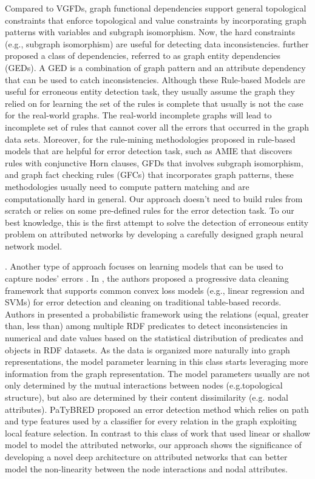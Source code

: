 Compared to VGFDs, graph functional dependencies support general topological constraints
that enforce topological and value constraints by incorporating graph patterns with variables and subgraph isomorphism. Now, the hard constraints (e.g., subgraph isomorphism) are useful for detecting data inconsistencies.  \cite{fan2017dependencies} further proposed a class of dependencies, referred to as graph entity dependencies (GEDs). A GED is a combination of graph pattern and an attribute dependency that can be used to catch inconsistencies.   
Although these Rule-based Models are useful for erroneous entity detection task, they usually assume the graph they relied on for learning the set of the rules is complete that usually is not the case for the real-world graphs. The real-world incomplete graphs will lead to incomplete set of rules that cannot cover all the errors that occurred in the graph data sets. Moreover, for the rule-mining methodologies proposed in rule-based models that are helpful for error detection task, such as AMIE \cite{galarraga2013amie,galarraga2015fast} that discovers rules with conjunctive Horn clauses, GFDs \cite{lin2019discovering} that involves subgraph isomorphism, and
graph fact checking rules (GFCs) that incorporates graph patterns, these methodologies usually need to compute pattern matching and are computationally hard in general. Our approach doesn't need to build rules from scratch or relies on some pre-defined rules for the error detection task. To our best knowledge, this is the first attempt to solve the detection of erroneous entity problem on attributed networks by developing a carefully designed graph neural network
model.

.
Another type of approach focuses on learning models that can be used to capture nodes' errors \cite{}. 
In \cite{krishnan2016activeclean}, the authors proposed a progressive data cleaning framework that supports common convex loss models (e.g., linear regression and SVMs) for error detection and cleaning on traditional table-based records. Authors in \cite{} presented a probabilistic framework using the relations (equal, greater than, less than) among multiple
RDF predicates to detect inconsistencies in numerical and date
values based on the statistical distribution of predicates and objects in RDF datasets.
As the data is organized more naturally into graph representations, the model parameter learning in this class starts leveraging more information from the graph representation. The model parameters usually are not only determined by the 
mutual interactions between nodes (e.g.topological structure), but also are determined by their content dissimilarity
(e.g. nodal attributes).  PaTyBRED \cite{} proposed an error detection method which relies on path and type features used by a classifier for
every relation in the graph exploiting local feature selection.  In contrast to this class of work that used linear or shallow model to model the attributed networks, our approach shows the significance of developing a novel deep architecture on attributed networks that can better model the non-linearity between the node interactions and nodal attributes. 